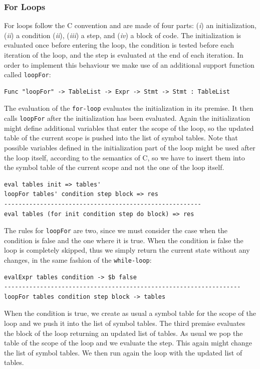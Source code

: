 \subsubsection{For Loops}
For loops follow the C convention and are made of four parts: (\textit{i}) an initialization, (\textit{ii}) a condition (\textit{ii}), (\textit{iii}) a step, and (\textit{iv}) a block of code. The initialization is evaluated once before entering the loop, the condition is tested before each iteration of the loop, and the step is evaluated at the end of each iteration. In order to implement this behaviour we make use of an additional support function called \texttt{loopFor}:

\begin{lstlisting}
Func "loopFor" -> TableList -> Expr -> Stmt -> Stmt : TableList
\end{lstlisting}

\noindent
The evaluation of the \texttt{for-loop} evaluates the initialization in its premise. It then calls \texttt{loopFor} after the initialization has been evaluated. Again the initialization might define additional variables that enter the scope of the loop, so the updated table of the current scope is pushed into the list of symbol tables. Note that possible variables defined in the initialization part of the loop might be used after the loop itself, according to the semantics of C, so we have to insert them into the symbol table of the current scope and not the one of the loop itself.

\begin{lstlisting}
eval tables init => tables'
loopFor tables' condition step block => res
-------------------------------------------------------
eval tables (for init condition step do block) => res
\end{lstlisting}

The rules for \texttt{loopFor} are two, since we must consider the case when the condition is false and the one where it is true. When the condition is false the loop is completely skipped, thus we simply return the current state without any changes, in the same fashion of the \texttt{while-loop}:

\begin{lstlisting}
evalExpr tables condition -> $b false
------------------------------------------------------------------
loopFor tables condition step block -> tables
\end{lstlisting}

\noindent
When the condition is true, we create as usual a symbol table for the scope of the loop and we push it into the list of symbol tables. The third premise evaluates the block of the loop returning an updated list of tables. As usual we pop the table of the scope of the loop and we evaluate the step. This again might change the list of symbol tables. We then run again the loop with the updated list of tables.

